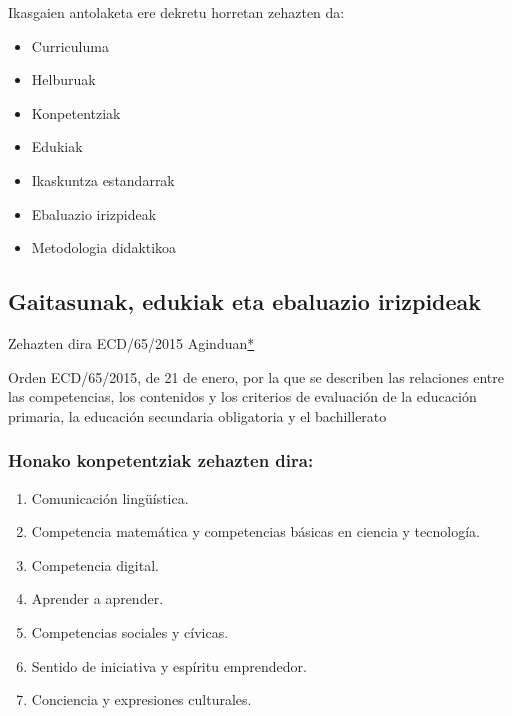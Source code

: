 \documentclass[]{book}
\providecommand{\tightlist}{%
  \setlength{\itemsep}{0pt}\setlength{\parskip}{0pt}}
\begin{document}
Ikasgaien antolaketa ere dekretu horretan zehazten da:

\begin{itemize}
\tightlist
\item
  Curriculuma
\item
  Helburuak
\item
  Konpetentziak
\item
  Edukiak
\item
  Ikaskuntza estandarrak
\item
  Ebaluazio irizpideak
\item
  Metodologia didaktikoa
\end{itemize}

\hypertarget{gaitasunak-edukiak-eta-ebaluazio-irizpideak}{%
\subsection{Gaitasunak, edukiak eta ebaluazio irizpideak}\label{gaitasunak-edukiak-eta-ebaluazio-irizpideak}}

Zehazten dira ECD/65/2015 Aginduan\href{https://www.boe.es/buscar/doc.php?id=BOE-A-2015-738}{*}

Orden ECD/65/2015, de 21 de enero, por la que se describen las relaciones entre las competencias, los contenidos y los criterios de evaluación de la educación primaria, la educación secundaria obligatoria y el bachillerato

\hypertarget{honako-konpetentziak-zehazten-dira}{%
\subsubsection{Honako konpetentziak zehazten dira:}\label{honako-konpetentziak-zehazten-dira}}

\begin{enumerate}
\def\labelenumi{\arabic{enumi}.}
\tightlist
\item
  Comunicación lingüística.
\item
  Competencia matemática y competencias básicas en ciencia y tecnología.
\item
  Competencia digital.
\item
  Aprender a aprender.
\item
  Competencias sociales y cívicas.
\item
  Sentido de iniciativa y espíritu emprendedor.
\item
  Conciencia y expresiones culturales.
\end{enumerate}
\end{document}
